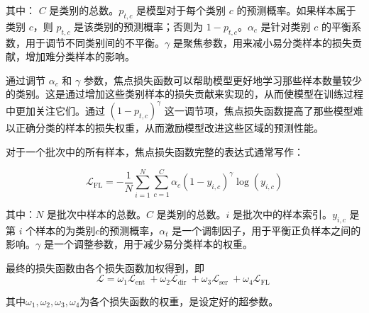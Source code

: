 其中：
\( C \) 是类别的总数。\( p_{t,c} \) 是模型对于每个类别 \( c \) 的预测概率。如果样本属于类别 \( c \)，则 \( p_{t,c} \) 是该类别的预测概率；否则为 \( 1 - p_{t,c} \)。\( \alpha_c \) 是针对类别 \( c \) 的平衡系数，用于调节不同类别间的不平衡。\( \gamma \) 是聚焦参数，用来减小易分类样本的损失贡献，增加难分类样本的影响。


通过调节 \( \alpha_c \) 和 \( \gamma \) 参数，焦点损失函数可以帮助模型更好地学习那些样本数量较少的类别。这是通过增加这些类别样本的损失贡献来实现的，从而使模型在训练过程中更加关注它们。通过 \( (1 - p_{t,c})^\gamma \) 这一调节项，焦点损失函数提高了那些模型难以正确分类的样本的损失权重，从而激励模型改进这些区域的预测性能。


对于一个批次中的所有样本，焦点损失函数完整的表达式通常写作：

\begin{equation}
    \mathcal{L}_{\text {FL}} = -\frac{1}{N} \sum_{i=1}^{N}\sum_{c=1}^C \alpha_c (1 - y_{i,c})^\gamma \log(y_{i,c})
\end{equation}


其中：\(N\) 是批次中样本的总数。\( C \) 是类别的总数。\(i\) 是批次中的样本索引。\(y_{i,c}\) 是第 \(i\) 个样本的为类别\( c \)的预测概率，\(\alpha_t\) 是一个调制因子，用于平衡正负样本之间的影响。\(\gamma\) 是一个调整参数，用于减少易分类样本的权重。



最终的损失函数由各个损失函数加权得到，即
\begin{equation}
    \mathcal{L}=\omega_1\mathcal{L}_{\text {ent }}+\omega_2\mathcal{L}_{\text {dir }}+\omega_3\mathcal{L}_{\text {ser }}
    +\omega_4\mathcal{L}_{\text {FL }}
\end{equation}

其中$\omega_1,\omega_2,\omega_3,\omega_4$为各个损失函数的权重，是设定好的超参数。

